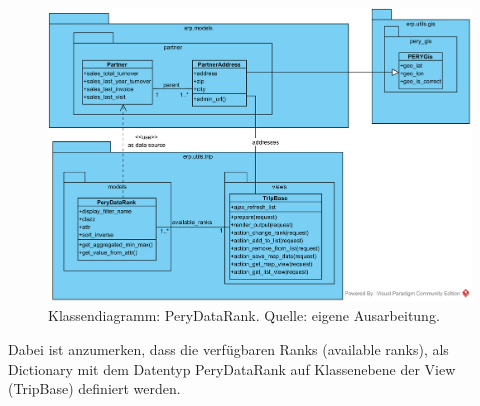 \documentclass[Bachelorarbeit.tex]{subfiles}
\begin{document}
\begin{figure}[H]
\centering
\includegraphics[width=0.9\linewidth]{img/Implementierung/ClassDiagrammRank}
\caption[k]{Klassendiagramm: PeryDataRank. Quelle: eigene Ausarbeitung.}
\label{fig:ClassDiagrammRank}
\end{figure}

Dabei ist anzumerken, dass die verfügbaren Ranks (available ranks), als Dictionary mit dem Datentyp PeryDataRank auf Klassenebene der View (TripBase) definiert werden.
\end{document}
